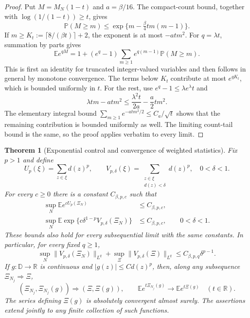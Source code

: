 \documentclass[11pt,a4paper]{article}
\numberwithin{equation}{section}
\newtheorem{theorem}{Theorem}[section]
\theoremstyle{definition}
\theoremstyle{remark}
\newcommand{\D}{\mathbb D}
\begin{document}
\begin{proof}
Put $M=M_N(1-t)$ and $a=\beta/16$. The compact-count bound, together
with $\log(1/(1-t))\ge t$, gives
\[
 \mathbb P(M\ge m)\le
 \exp\{m-\tfrac\beta4t m(m-1)\}.
\]
If $m\ge K_t:=\lceil 8/(\beta t)\rceil+2$, the exponent is at most
$-a t m^2$. For $q=\lambda t$, summation by parts gives
\[
 \mathbb Ee^{qM}
 =1+(e^q-1)\sum_{m\ge1}e^{q(m-1)}\mathbb P(M\ge m).
\]
This is first an identity for truncated integer-valued variables and
then follows in general by monotone convergence. The terms below
$K_t$ contribute at most $e^{qK_t}$, which is bounded uniformly in $t$.
For the rest, use $e^q-1\le\lambda e^\lambda t$ and
\[
 \lambda t m-a t m^2
 \le \frac{\lambda^2t}{2a}-\frac a2t m^2.
\]
The elementary integral bound
$\sum_{m\ge1}e^{-at m^2/2}\le C_a/\sqrt t$ shows that the remaining
contribution is bounded uniformly as well. The limiting count-tail
bound is the same, so the proof applies verbatim to every limit.
\end{proof}

\begin{theorem}[Exponential control and convergence of weighted statistics]
\label{thm:boundary-weight-exponential}
Fix $p>1$ and define
\[
 U_p(\xi)=\sum_{z\in\xi}d(z)^p,\qquad
 V_{p,\delta}(\xi)=\sum_{\substack{z\in\xi\\d(z)<\delta}}d(z)^p,
 \quad 0<\delta<1.
\]
For every $c\ge0$ there is a constant $C_{\beta,p,c}$ such that
\begin{align}
 \sup_N\mathbb E e^{cU_p(\Xi_N)}&\le C_{\beta,p,c},
 \label{eq:boundary-weight-all-exponentials}\\
 \sup_N\mathbb E
  \exp\{c\delta^{1-p}V_{p,\delta}(\Xi_N)\}
 &\le C_{\beta,p,c},\qquad 0<\delta<1.
 \label{eq:boundary-weight-tail-exponentials}
\end{align}
These bounds also hold for every subsequential limit with the same
constants. In particular, for every fixed $q\ge1$,
\[
 \sup_N\|V_{p,\delta}(\Xi_N)\|_{L^q}
 +\sup_\Xi\|V_{p,\delta}(\Xi)\|_{L^q}
 \le C_{\beta,p,q}\delta^{p-1}.
\]
If $g:\D\to\mathbb R$ is continuous and
$|g(z)|\le C d(z)^p$, then, along any subsequence
$\Xi_{N_j}\Rightarrow\Xi$,
\[
 (\Xi_{N_j},\Xi_{N_j}(g))\Rightarrow(\Xi,\Xi(g)),
 \qquad
 \mathbb E e^{t\Xi_{N_j}(g)}\longrightarrow
                  \mathbb E e^{t\Xi(g)}\quad(t\in\mathbb R).
\]
The series defining $\Xi(g)$ is absolutely convergent almost surely.
The assertions extend jointly to any finite collection of such functions.
\end{theorem}
\end{document}
